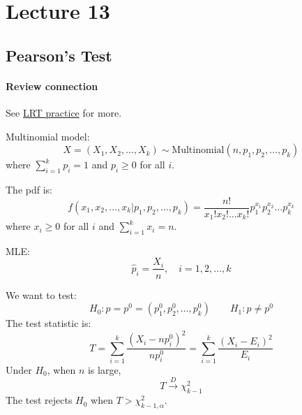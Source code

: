 
\section[Lecture 13 (Oct 23) -- {\it Pearson's Test and Bayesian Statistics}]{Lecture 13}

\subsection{Pearson's Test}
\label{sub:PT}

\paragraph{Review connection}\label{par:review-questions-link}
See \hyperref[sub:Application of Likelihood Ratio Test]{LRT practice} for more.

Multinomial model:
\[X = (X_1,X_2,\dots,X_k) \sim \text{Multinomial}(n,p_1,p_2,\dots,p_k)\]
where \(\sum_{i=1}^{k} p_i = 1\) and \(p_i \ge 0\) for all \(i\).

The pdf is:
\[f(x_1,x_2,\dots,x_k|p_1,p_2,\dots,p_k) = \dfrac{n!}{x_1! x_2! \dots x_k!} p_1^{x_1} p_2^{x_2} \dots p_k^{x_k}\]
where \(x_i \ge 0\) for all \(i\) and \(\sum_{i=1}^{k} x_i = n\).

MLE:
\[\hat p_i = \dfrac{X_i}{n}, \quad i=1,2,\dots,k\]

\begin{db}
We want to test:
\[H_0: p = p^0 = (p_1^0,p_2^0,\dots,p_k^0) \qquad H_1: p \neq p^0\]
The test statistic is:
\[T = \sum_{i=1}^k \dfrac{(X_i - n p_i^0)^2}{n p_i^0} = \sum_{i=1}^k \dfrac{(X_i - E_i)^2}{E_i}\]
Under \(H_0\), when \(n\) is large, 
\[T \overset{D}{\rightarrow} \chi^2_{k-1}\]
The test rejects \(H_0\) when \(T > \chi^2_{k-1,\alpha}\).
\end{db}

